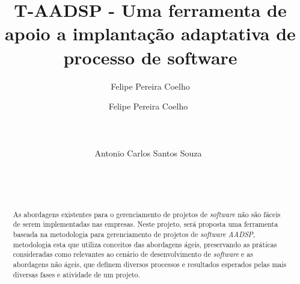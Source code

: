 \documentclass{acm_proc_article-sp}
\author{Felipe Pereira Coelho}
\begin{document}
\title{ T-AADSP - Uma ferramenta de apoio a implantação adaptativa de processo de software}

\author{
%
%
\alignauthor
Felipe Pereira Coelho\ \\
       \\
       \\
       \\
\alignauthor
Antonio Carlos Santos Souza\ \\
       \\
       \\
       \\
}


\maketitle
\begin{abstract}
As abordagens existentes para o gerenciamento de projetos de \textit{software} não são fáceis de serem implementadas nas empresas. Neste projeto, será proposta uma ferramenta baseada na metodologia para gerenciamento de projetos de \textit{software} \textit{AADSP}, metodologia esta que utiliza conceitos das abordagens ágeis, preservando as práticas consideradas como relevantes ao cenário de desenvolvimento de \textit{software} e as abordagens não ágeis, que definem diversos processos e resultados esperados pelas mais diversas fases e atividade de um projeto. 
\end{abstract}

\end{document}
